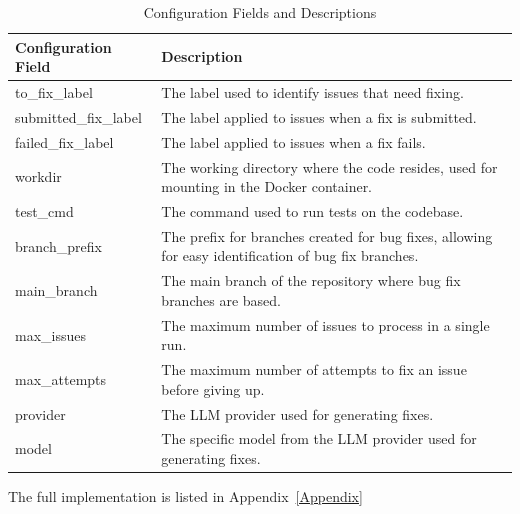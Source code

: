\renewcommand{\arraystretch}{1.5}
\begin{longtable}{@{\extracolsep{\fill}} p{3.5cm} | p{11cm} @{}}
    \caption{Configuration Fields and Descriptions} \label{table:configuration}                                                         \\
    \toprule
    \textbf{Configuration Field} & \textbf{Description}                                                                                 \\
    \midrule
    \endfirsthead

    \bottomrule
    \endfoot

    to\_fix\_label               & The label used to identify issues that need fixing.                                                  \\ \hline
    submitted\_fix\_label        & The label applied to issues when a fix is submitted.                                                 \\ \hline
    failed\_fix\_label           & The label applied to issues when a fix fails.                                                        \\ \hline
    workdir                      & The working directory where the code resides, used for mounting in the Docker container.             \\ \hline
    test\_cmd                    & The command used to run tests on the codebase.                                                       \\ \hline
    branch\_prefix               & The prefix for branches created for bug fixes, allowing for easy identification of bug fix branches. \\ \hline
    main\_branch                 & The main branch of the repository where bug fix branches are based.                                  \\ \hline
    max\_issues                  & The maximum number of issues to process in a single run.                                             \\\hline
    max\_attempts                & The maximum number of attempts to fix an issue before giving up.                                     \\ \hline
    provider                     & The LLM provider used for generating fixes.                                                          \\ \hline
    model                        & The specific model from the LLM provider used for generating fixes.                                  \\
\end{longtable}


The full implementation is listed in Appendix~\ref{Appendix}